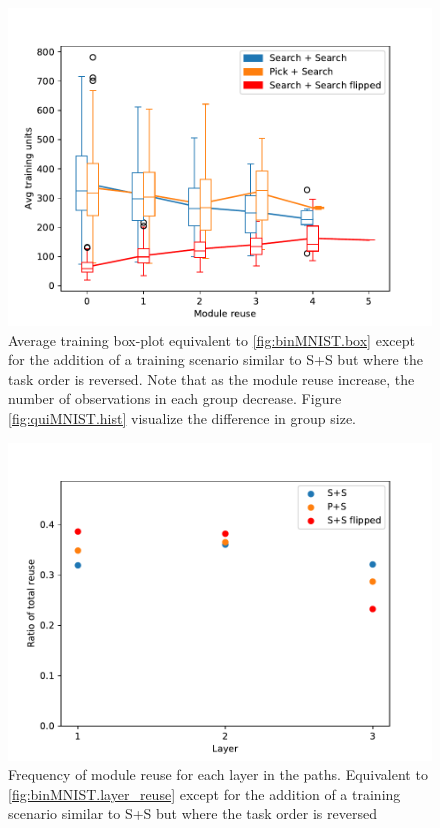 \begin{figure}[t]
    \includegraphics[width=\textwidth]{Chapters/4.Experiments/exp1/figures/QUIN_training_boxplot.pdf}
    \caption{Average training box-plot equivalent to \ref{fig:binMNIST.box} except for the addition of a training scenario similar to S+S but where the task order is reversed. Note that as the module reuse increase, the number of observations in each group decrease. Figure \ref{fig:quiMNIST.hist} visualize the difference in group size.}
    \label{fig:quinMNIST.box}
\end{figure}

\begin{figure}[t]
    \includegraphics[width=\textwidth]{Chapters/4.Experiments/exp1/figures/QUIN_reuse_by_layer.pdf}
    \caption{Frequency of module reuse for each layer in the paths. Equivalent to \ref{fig:binMNIST.layer_reuse} except for the addition of a training scenario similar to S+S but where the task order is reversed}
    \label{fig:quinMNIST.layer_reuse}
\end{figure}

